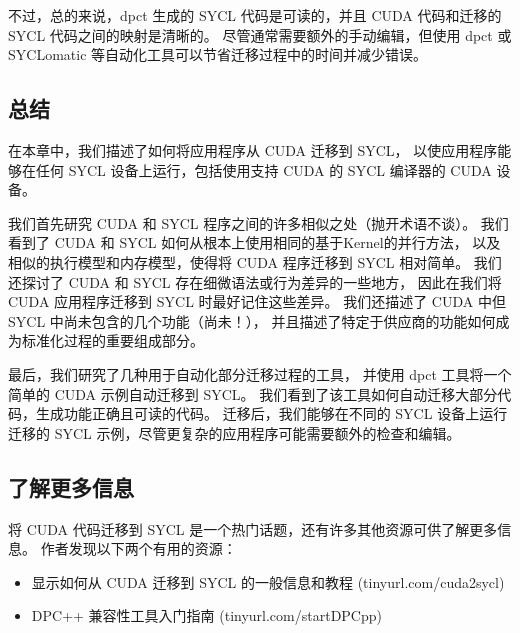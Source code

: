 不过，总的来说，dpct 生成的 SYCL 代码是可读的，并且 CUDA 代码和迁移的 SYCL 代码之间的映射是清晰的。 
尽管通常需要额外的手动编辑，但使用 dpct 或 SYCLomatic 等自动化工具可以节省迁移过程中的时间并减少错误。

\subsection{总结}
在本章中，我们描述了如何将应用程序从 CUDA 迁移到 SYCL，
以使应用程序能够在任何 SYCL 设备上运行，包括使用支持 CUDA 的 SYCL 编译器的 CUDA 设备。

我们首先研究 CUDA 和 SYCL 程序之间的许多相似之处（抛开术语不谈）。 
我们看到了 CUDA 和 SYCL 如何从根本上使用相同的基于Kernel的并行方法，
以及相似的执行模型和内存模型，使得将 CUDA 程序迁移到 SYCL 相对简单。 
我们还探讨了 CUDA 和 SYCL 存在细微语法或行为差异的一些地方，
因此在我们将 CUDA 应用程序迁移到 SYCL 时最好记住这些差异。 
我们还描述了 CUDA 中但 SYCL 中尚未包含的几个功能（尚未！），
并且描述了特定于供应商的功能如何成为标准化过程的重要组成部分。

最后，我们研究了几种用于自动化部分迁移过程的工具，
并使用 dpct 工具将一个简单的 CUDA 示例自动迁移到 SYCL。 
我们看到了该工具如何自动迁移大部分代码，生成功能正确且可读的代码。 
迁移后，我们能够在不同的 SYCL 设备上运行迁移的 SYCL 示例，尽管更复杂的应用程序可能需要额外的检查和编辑。

\subsection{了解更多信息}
将 CUDA 代码迁移到 SYCL 是一个热门话题，还有许多其他资源可供了解更多信息。 作者发现以下两个有用的资源：

\begin{itemize}
	\item 显示如何从 CUDA 迁移到 SYCL 的一般信息和教程 (tinyurl.com/cuda2sycl)

	\item DPC++ 兼容性工具入门指南 (tinyurl.com/startDPCpp)
\end{itemize}